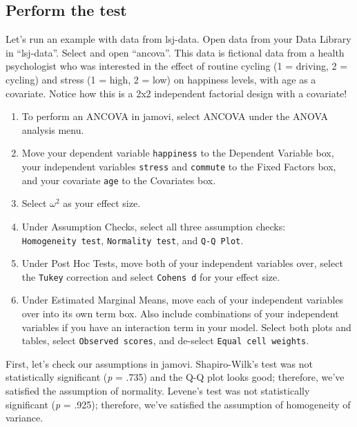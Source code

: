 \documentclass[
]{book}
\begin{document}
\hypertarget{perform-the-test-8}{%
\subsection{Perform the test}\label{perform-the-test-8}}

Let's run an example with data from lsj-data. Open data from your Data Library in ``lsj-data''. Select and open ``ancova''. This data is fictional data from a health psychologist who was interested in the effect of routine cycling (1 = driving, 2 = cycling) and stress (1 = high, 2 = low) on happiness levels, with age as a covariate. Notice how this is a 2x2 independent factorial design with a covariate!

\begin{enumerate}
\def\labelenumi{\arabic{enumi}.}
\item
  To perform an ANCOVA in jamovi, select ANCOVA under the ANOVA analysis menu.
\item
  Move your dependent variable \texttt{happiness} to the Dependent Variable box, your independent variables \texttt{stress} and \texttt{commute} to the Fixed Factors box, and your covariate \texttt{age} to the Covariates box.
\item
  Select \(\omega^2\) as your effect size.
\item
  Under Assumption Checks, select all three assumption checks: \texttt{Homogeneity\ test}, \texttt{Normality\ test}, and \texttt{Q-Q\ Plot}.
\item
  Under Post Hoc Tests, move both of your independent variables over, select the \texttt{Tukey} correction and select \texttt{Cohen\textquotesingle{}s\ d} for your effect size.
\item
  Under Estimated Marginal Means, move each of your independent variables over into its own term box. Also include combinations of your independent variables if you have an interaction term in your model. Select both plots and tables, select \texttt{Observed\ scores}, and de-select \texttt{Equal\ cell\ weights}.
\end{enumerate}

First, let's check our assumptions in jamovi. Shapiro-Wilk's test was not statistically significant (\emph{p} = .735) and the Q-Q plot looks good; therefore, we've satisfied the assumption of normality. Levene's test was not statistically significant (\emph{p} = .925); therefore, we've satisfied the assumption of homogeneity of variance.
\end{document}
